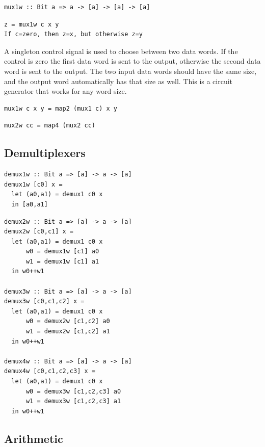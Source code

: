 \documentclass[]{svmono}
\begin{document}
\begin{verbatim}
mux1w :: Bit a => a -> [a] -> [a] -> [a]
\end{verbatim}



\begin{verbatim}
z = mux1w c x y
If c=zero, then z=x, but otherwise z=y
\end{verbatim}


A singleton control signal is used to choose between two data words.
If the control is zero the first data word is sent to the output,
otherwise the second data word is sent to the output.  The two input
data words should have the same size, and the output word
automatically has that size as well.  This is a circuit generator that
works for any word size.



\begin{verbatim}
mux1w c x y = map2 (mux1 c) x y
\end{verbatim}



\begin{verbatim}
mux2w cc = map4 (mux2 cc)
\end{verbatim}
\subsection*{Demultiplexers}
\label{sec:org4dd00ab}



\begin{verbatim}
demux1w :: Bit a => [a] -> a -> [a]
demux1w [c0] x =
  let (a0,a1) = demux1 c0 x
  in [a0,a1]
\end{verbatim}



\begin{verbatim}
demux2w :: Bit a => [a] -> a -> [a]
demux2w [c0,c1] x =
  let (a0,a1) = demux1 c0 x
      w0 = demux1w [c1] a0
      w1 = demux1w [c1] a1
  in w0++w1

demux3w :: Bit a => [a] -> a -> [a]
demux3w [c0,c1,c2] x =
  let (a0,a1) = demux1 c0 x
      w0 = demux2w [c1,c2] a0
      w1 = demux2w [c1,c2] a1
  in w0++w1

demux4w :: Bit a => [a] -> a -> [a]
demux4w [c0,c1,c2,c3] x =
  let (a0,a1) = demux1 c0 x
      w0 = demux3w [c1,c2,c3] a0
      w1 = demux3w [c1,c2,c3] a1
  in w0++w1
\end{verbatim}
\subsection*{Arithmetic}
\label{sec:org85bf62c}
\end{document}
